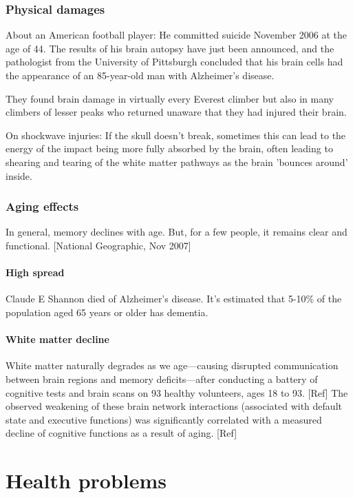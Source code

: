 \documentclass[oneside, article]{memoir}
\begin{document}
\section{Physical damages}
About an American football player: He committed suicide November 2006 at the age of 44. The results of his brain autopsy have just been announced, and the pathologist from the University of Pittsburgh concluded that his brain cells had the appearance of an 85-year-old man with Alzheimer's disease.

They found brain damage in virtually every Everest climber but also in many climbers of lesser peaks who returned unaware that they had injured their brain.

On shockwave injuries: If the skull doesn't break, sometimes this can lead to the energy of the impact being more fully absorbed by the brain, often leading to shearing and tearing of the white matter pathways as the brain 'bounces around' inside.

\section{Aging effects}
In general, memory declines with age. But, for a few people, it remains clear and functional. [National Geographic, Nov 2007]

\subsection{High spread}
Claude E Shannon died of Alzheimer's disease. It's estimated that 5-10\% of the population aged 65 years or older has dementia.

\subsection{White matter decline}
White matter naturally degrades as we age—causing disrupted communication between brain regions and memory deficits—after conducting a battery of cognitive tests and brain scans on 93 healthy volunteers, ages 18 to 93. [Ref] The observed weakening of these brain network interactions (associated with default state and executive functions) was significantly correlated with a measured decline of cognitive functions as a result of aging. [Ref] 

\part{Health problems}
\end{document}
